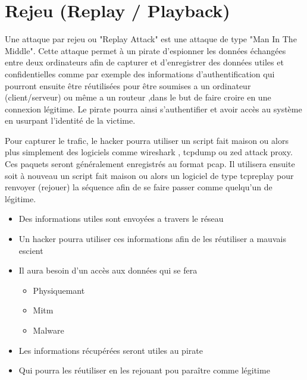 

\newpage
\section{Rejeu (Replay / Playback)}\label{vulnerabilites:reseau:replay}

Une attaque par rejeu ou "Replay Attack" est une attaque de type "Man In The Middle". Cette attaque permet à un pirate d'espionner les données échangées entre deux ordinateurs afin de capturer et d'enregistrer des données utiles et confidentielles comme par exemple des informations d'authentification qui pourront ensuite être réutilisées pour être soumises a un ordinateur (client/serveur) ou même a un routeur ,dans le but de faire croire en une connexion légitime. Le pirate pourra ainsi s'authentifier et avoir accès au système en usurpant l'identité de la victime.
\begin{flushleft}
Pour capturer le trafic, le hacker pourra utiliser un script fait maison ou alors plus simplement des logiciels comme wireshark , tcpdump ou zed attack proxy. Ces paquets seront généralement enregistrés au format pcap. Il utilisera ensuite soit à nouveau un script fait maison ou alors un logiciel de type tcpreplay pour renvoyer (rejouer) la séquence afin de se faire passer comme quelqu'un de légitime.
\end{flushleft}

\bigskip

\begin{itemize}
\item Des informations utiles sont envoyées a travers le réseau
\item Un hacker pourra utiliser ces informations afin de les réutiliser a mauvais escient
\item Il aura besoin d'un accès aux données qui se fera
\begin{itemize}
\item Physiquemant
\item Mitm 
\item Malware
\end{itemize}
\item Les informations récupérées seront utiles au pirate
\item Qui pourra les réutiliser en les rejouant pou paraître comme légitime
\end{itemize}


